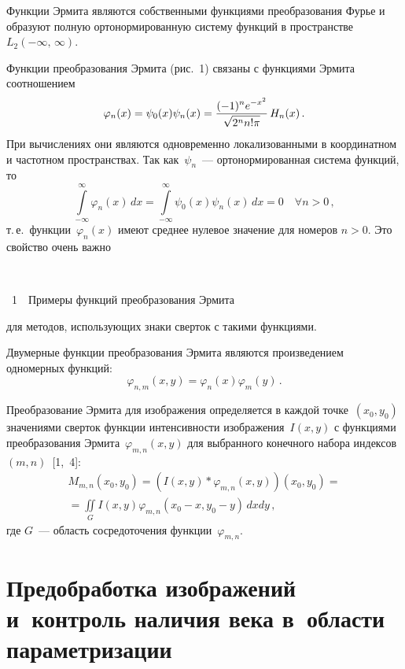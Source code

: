 \begin{multicols}{2}
Функции Эрмита являются собственными функциями преобразования Фурье и образуют полную 
ортонормированную систему функций в пространстве~$L_2(-\infty,\,\infty)$. 

Функции преобразования Эрмита (рис.~1) связаны с функциями Эрмита соотношением
$$
\varphi_n(x) =\psi_0(x)\psi_n(x) =\displaystyle\frac{\displaystyle (-1)^n e^{-x^2}\mathstrut}{\displaystyle \sqrt{2^n n!\pi}\mathstrut}\,H_n(x)\,.
$$
При вычислениях они являются одновременно локализованными в координатном и частотном 
пространствах. Так как~$\psi_n$~--- ортонормированная сис\-те\-ма функций, то
$$
\int\limits_{-\infty}^\infty \varphi_n(x)\,dx =\int\limits_{-\infty}^\infty \psi_0(x)\psi_n(x)\,dx =0\quad 
\forall n>0\,,
$$ 
т.\,е.\ функции~$\varphi_n(x)$ имеют среднее нулевое значение для номеров $n>0$. 
Это свойство очень важно\linebreak\vspace*{-12pt}
\pagebreak

\noindent
\begin{center} %
\vspace*{3pt}
\mbox{%
\epsfxsize=77.701mm %
}

{{\figurename~1}\ \ \small{Примеры функций преобразования Эрмита}}
\end{center}
\vspace*{-6pt}


\bigskip
\addtocounter{figure}{1}


\noindent
 для методов, исполь\-зу\-ющих знаки сверток с такими функциями. 

Двумерные функции преобразования Эрмита являются произведением одномерных функций:
$$
\varphi_{n,m}(x,y) =\varphi_n(x)\varphi_m(y)\,.
$$


Преобразование Эрмита для изображения опреде\-ляется в каждой точке~$(x_0,y_0)$ значениями 
сверток функции интенсивности изображения~$I(x,y)$ с функциями преобразования %
Эрмита~$\varphi_{m,n}(x,y)$ для выбранного конечного набора индек\-сов~$(m,n)$~[1,~4]:
\begin{multline*}
M_{m,n}(x_0,y_0) =(I(x,y) * \varphi_{m,n}(x,y))(x_0,y_0)={}\\
{}= \iint\limits_G I(x,y) \varphi_{m,n}(x_0-x,y_0-y)\,dxdy\,,
\end{multline*}
где $G$~--- область сосредоточения функции~$\varphi_{m,n}$.



\section{Предобработка изображений и~контроль наличия века в~области 
параметризации}


\end{multicols}
